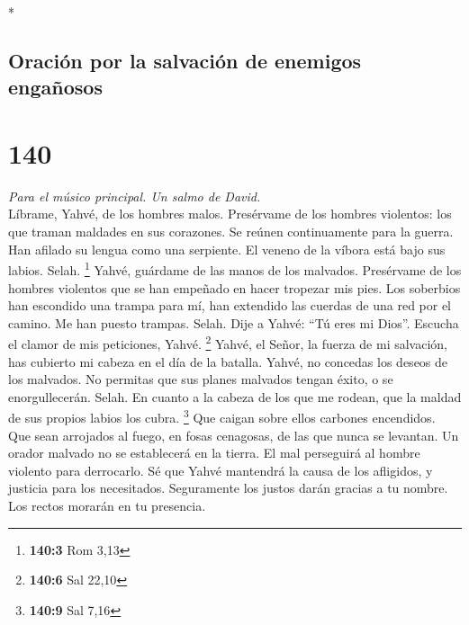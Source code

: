 \begin{paracol}{2}
\begin{otherlanguage}{english}
\end{otherlanguage}

\switchcolumn[0]*

\hypertarget{oraciuxf3n-por-la-salvaciuxf3n-de-enemigos-engauxf1osos}{%
\subsection{Oración por la salvación de enemigos
engañosos}\label{oraciuxf3n-por-la-salvaciuxf3n-de-enemigos-engauxf1osos}}

\hypertarget{section-278}{%
\section{140}\label{section-278}}

\emph{Para el músico principal. Un salmo de David.}\\
 Líbrame, Yahvé, de los hombres malos. Presérvame de los
hombres violentos:  los que traman maldades en sus
corazones. Se reúnen continuamente para la guerra.  Han
afilado su lengua como una serpiente. El veneno de la víbora está bajo
sus labios. Selah. \footnote{\textbf{140:3} Rom 3,13} 
Yahvé, guárdame de las manos de los malvados. Presérvame de los hombres
violentos que se han empeñado en hacer tropezar mis pies. 
Los soberbios han escondido una trampa para mí, han extendido las
cuerdas de una red por el camino. Me han puesto trampas. Selah.
 Dije a Yahvé: ``Tú eres mi Dios''. Escucha el clamor de
mis peticiones, Yahvé. \footnote{\textbf{140:6} Sal 22,10}
 Yahvé, el Señor, la fuerza de mi salvación, has cubierto
mi cabeza en el día de la batalla.  Yahvé, no concedas los
deseos de los malvados. No permitas que sus planes malvados tengan
éxito, o se enorgullecerán. Selah.  En cuanto a la cabeza
de los que me rodean, que la maldad de sus propios labios los cubra.
\footnote{\textbf{140:9} Sal 7,16}  Que caigan sobre
ellos carbones encendidos. Que sean arrojados al fuego, en fosas
cenagosas, de las que nunca se levantan.  Un orador
malvado no se establecerá en la tierra. El mal perseguirá al hombre
violento para derrocarlo.  Sé que Yahvé mantendrá la
causa de los afligidos, y justicia para los necesitados. 
Seguramente los justos darán gracias a tu nombre. Los rectos morarán en
tu presencia.

\switchcolumn
\begin{otherlanguage}{english}


\end{otherlanguage}
\end{paracol}

